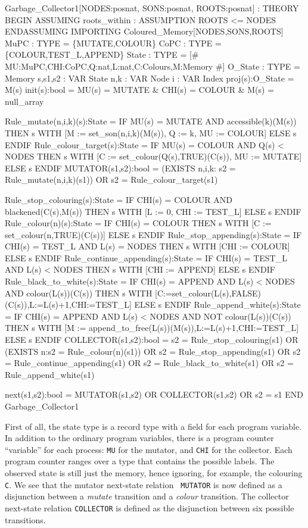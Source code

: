 \begin{smallsession}
Garbage_Collector1[NODES:posnat, SONS:posnat, ROOTS:posnat] : THEORY
BEGIN ASSUMING roots_within : ASSUMPTION ROOTS <= NODES ENDASSUMING
  IMPORTING Coloured_Memory[NODES,SONS,ROOTS]
  MuPC : TYPE = \{MUTATE,COLOUR\} CoPC : TYPE = \{COLOUR,TEST_L,APPEND\}
  State   : TYPE = [# MU:MuPC,CHI:CoPC,Q:nat,L:nat,C:Colours,M:Memory #]
  O_State : TYPE = Memory 
  s,s1,s2 : VAR State n,k : VAR Node i : VAR Index
  proj(s):O_State = M(s)
  init(s):bool = MU(s) = MUTATE & CHI(s) = COLOUR & M(s) = null_array

  Rule_mutate(n,i,k)(s):State =
    IF MU(s) = MUTATE AND accessible(k)(M(s)) THEN 
      s WITH [M := set_son(n,i,k)(M(s)), Q := k, MU := COLOUR] 
    ELSE s ENDIF
  Rule_colour_target(s):State =
    IF MU(s) = COLOUR AND Q(s) < NODES THEN 
      s WITH [C := set_colour(Q(s),TRUE)(C(s)), MU := MUTATE] 
    ELSE s ENDIF
  MUTATOR(s1,s2):bool =
    (EXISTS n,i,k: s2 = Rule_mutate(n,i,k)(s1)) OR 
    s2 = Rule_colour_target(s1)

  Rule_stop_colouring(s):State =
    IF CHI(s) = COLOUR AND blackened(C(s),M(s)) THEN
      s WITH [L := 0, CHI := TEST_L] ELSE s ENDIF
  Rule_colour(n)(s):State =
    IF CHI(s) = COLOUR THEN
      s WITH [C := set_colour(n,TRUE)(C(s))] ELSE s ENDIF
  Rule_stop_appending(s):State =
    IF CHI(s) = TEST_L AND L(s) = NODES THEN
      s WITH [CHI := COLOUR] ELSE s ENDIF
  Rule_continue_appending(s):State =
    IF CHI(s) = TEST_L AND L(s) < NODES THEN
      s WITH [CHI := APPEND] ELSE s ENDIF
  Rule_black_to_white(s):State =
    IF CHI(s) = APPEND AND L(s) < NODES AND colour(L(s))(C(s)) THEN
      s WITH [C:=set_colour(L(s),FALSE)(C(s)),L:=L(s)+1,CHI:=TEST_L]
    ELSE s ENDIF
  Rule_append_white(s):State =
    IF CHI(s) = APPEND AND L(s) < NODES AND NOT colour(L(s))(C(s)) THEN
      s WITH [M := append_to_free(L(s))(M(s)),L:=L(s)+1,CHI:=TEST_L]
    ELSE s ENDIF
  COLLECTOR(s1,s2):bool = 
      s2 = Rule_stop_colouring(s1) OR (EXISTS n:s2 = Rule_colour(n)(s1))
   OR s2 = Rule_stop_appending(s1) OR s2 = Rule_continue_appending(s1) 
   OR s2 = Rule_black_to_white(s1) OR s2 = Rule_append_white(s1)

  next(s1,s2):bool = MUTATOR(s1,s2) OR COLLECTOR(s1,s2) OR s2 = s1
END Garbage_Collector1
\end{smallsession}

First of all, the state type is a record type  with a field for
each program variable.  In addition to the ordinary program variables,
there is a program counter ``variable'' for each process: {\tt MU} for
the  mutator, and {\tt CHI}  for the collector.   Each program counter
ranges over a type  that contains the  possible labels.  The  observed
state  is   still just  the  memory,  hence ignoring, for   example, the
colouring  {\tt C}\@.  We see that  the mutator next-state relation {\tt
  MUTATOR} is now   defined as a  disjunction  between a {\em  mutate}
transition and a {\em  colour} transition. The collector  next-state
relation {\tt COLLECTOR} is   defined as the disjunction  between  six
possible transitions.

